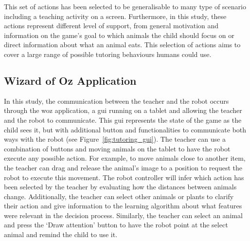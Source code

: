 This set of actions has been selected to be generalisable to many type of scenario including a teaching activity on a screen. Furthermore, in this study, these actions represent different level of support, from general motivation and information on the game's goal to which animals the child should focus on or direct information about what an animal eats. This selection of actions aims to cover a large range of possible tutoring behaviours humans could use. 

\subsection{Wizard of Oz Application}

In this study, the communication between the teacher and the robot occurs through the \gls{woz} application, a \gls{gui} running on a tablet and allowing the teacher and the robot to communicate. This \gls{gui} represents the state of the game as the child sees it, but with additional button and functionalities to communicate both ways with the robot (see Figure~\ref{fig:tutoring_gui}). The teacher can use a combination of buttons and moving animals on the tablet to have the robot execute any possible action. For example, to move animals close to another item, the teacher can drag and release the animal's image to a position to request the robot to execute this movement. The robot controller will infer which action has been selected by the teacher by evaluating how the distances between animals change. Additionally, the teacher can select other animals or plants to clarify their action and give information to the learning algorithm about what features were relevant in the decision process. Similarly, the teacher can select an animal and press the `Draw attention' button to have the robot point at the select animal and remind the child to use it.
